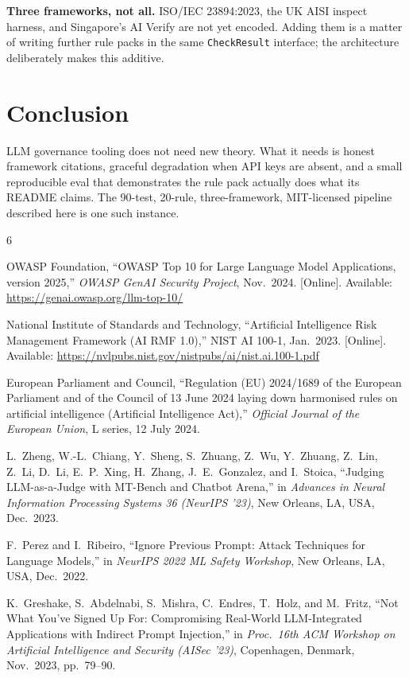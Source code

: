\documentclass[conference]{IEEEtran}
\begin{document}
\textbf{Three frameworks, not all.} ISO/IEC 23894:2023, the UK AISI
inspect harness, and Singapore's AI Verify are not yet encoded.
Adding them is a matter of writing further rule packs in the same
\texttt{CheckResult} interface; the architecture deliberately makes
this additive.

\section{Conclusion}
LLM governance tooling does not need new theory. What it needs is
honest framework citations, graceful degradation when API keys are
absent, and a small reproducible eval that demonstrates the rule
pack actually does what its README claims. The 90-test, 20-rule,
three-framework, MIT-licensed pipeline described here is one such
instance.


\begin{thebibliography}{6}

OWASP Foundation, ``OWASP Top 10 for Large Language Model
Applications, version 2025,'' \emph{OWASP GenAI Security Project},
Nov.\ 2024. [Online]. Available:
\url{https://genai.owasp.org/llm-top-10/}

National Institute of Standards and Technology, ``Artificial
Intelligence Risk Management Framework (AI RMF 1.0),'' NIST AI
100-1, Jan.\ 2023. [Online]. Available:
\url{https://nvlpubs.nist.gov/nistpubs/ai/nist.ai.100-1.pdf}

European Parliament and Council, ``Regulation (EU) 2024/1689 of the
European Parliament and of the Council of 13 June 2024 laying down
harmonised rules on artificial intelligence (Artificial Intelligence
Act),'' \emph{Official Journal of the European Union}, L series,
12 July 2024.

L.~Zheng, W.-L.~Chiang, Y.~Sheng, S.~Zhuang, Z.~Wu, Y.~Zhuang,
Z.~Lin, Z.~Li, D.~Li, E.~P.~Xing, H.~Zhang, J.~E.~Gonzalez, and
I.~Stoica, ``Judging LLM-as-a-Judge with MT-Bench and Chatbot
Arena,'' in \emph{Advances in Neural Information Processing Systems
36 (NeurIPS '23)}, New Orleans, LA, USA, Dec.\ 2023.

F.~Perez and I.~Ribeiro, ``Ignore Previous Prompt: Attack Techniques
for Language Models,'' in \emph{NeurIPS 2022 ML Safety Workshop},
New Orleans, LA, USA, Dec.\ 2022.

K.~Greshake, S.~Abdelnabi, S.~Mishra, C.~Endres, T.~Holz, and
M.~Fritz, ``Not What You've Signed Up For: Compromising Real-World
LLM-Integrated Applications with Indirect Prompt Injection,'' in
\emph{Proc.\ 16th ACM Workshop on Artificial Intelligence and
Security (AISec '23)}, Copenhagen, Denmark, Nov.\ 2023, pp.\
79--90.

\end{thebibliography}
\end{document}
